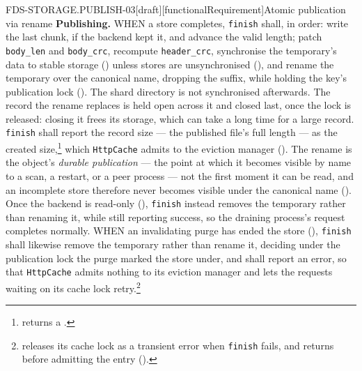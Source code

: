 \begin{requirement}{FDS-STORAGE.PUBLISH-03}[draft][functionalRequirement]{Atomic publication via rename}
  \textbf{Publishing.} WHEN a store completes, \texttt{finish} shall, in
  order: write the last chunk, if the backend kept it, and advance the valid
  length; patch \texttt{body\_len} and \texttt{body\_crc}, recompute
  \texttt{header\_crc}, synchronise the temporary's data to stable storage
  () unless stores are unsynchronised
  (), and rename the temporary over the
  canonical name, dropping the suffix, while holding the key's publication
  lock (). The shard directory is not
  synchronised afterwards. The record the rename replaces is held open
  across it and closed last, once the lock is released: closing it frees
  its storage, which can take a long time for a large record.
  \texttt{finish} shall report the record size --- the published
  file's full length --- as the created
  size,\footnote{
  returns a .}
  which \texttt{HttpCache} admits to the eviction manager
  (). The rename is the object's \emph{durable
  publication} --- the point at which it becomes visible by name to a scan, a
  restart, or a peer process --- not the first moment it can be read, and an
  incomplete store therefore never becomes visible under the canonical name
  (). Once the backend is read-only
  (), \texttt{finish} instead removes the
  temporary rather than renaming it, while still reporting success, so the
  draining process's request completes normally. WHEN an invalidating purge
  has ended the store (), \texttt{finish}
  shall likewise remove the temporary rather than rename it, deciding under
  the publication lock the purge marked the store under, and shall report
  an error, so that \texttt{HttpCache} admits nothing to its eviction
  manager and lets the requests waiting on its cache lock
  retry.\footnote{
  releases its cache lock as a transient error when \texttt{finish} fails,
  and returns before admitting the entry
  ().}


\end{requirement}
